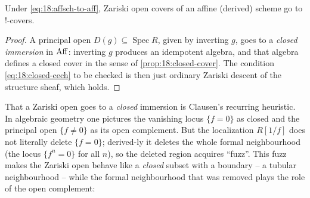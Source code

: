 \begin{proposition}
\label{prop:18:zariski}
Under \eqref{eq:18:affsch-to-aff}, Zariski open covers of an affine (derived)
scheme go to $!$-covers.
\end{proposition}

\begin{proof}
A principal open $D(g)\subseteq\operatorname{Spec}R$, given by inverting $g$, goes
to a \emph{closed immersion} in $\operatorname{Aff}$: inverting $g$ produces an idempotent
algebra, and that algebra defines a closed cover in the sense of
\cref{prop:18:closed-cover}. The condition \eqref{eq:18:closed-cech} to be checked
is then just ordinary Zariski descent of the structure sheaf, which holds.
\end{proof}

\begin{remark}
\label{rmk:18:fuzz}
That a Zariski open goes to a \emph{closed} immersion is Clausen's recurring
heuristic. In algebraic geometry one pictures the vanishing locus $\{f=0\}$ as
closed and the principal open $\{f\ne0\}$ as its open complement. But the
localization $R[1/f]$ does not literally delete $\{f=0\}$; derived-ly it deletes
the whole formal neighbourhood (the locus $\{f^n=0\}$ for all $n$), so the deleted
region acquires ``fuzz''. This fuzz makes the Zariski open behave like a
\emph{closed} subset with a boundary -- a tubular neighbourhood -- while the formal
neighbourhood that was removed plays the role of the open complement:
\begin{center}

\end{center}
\end{remark}
